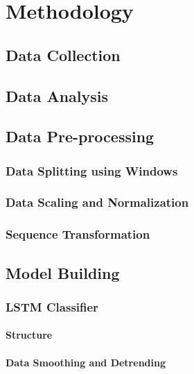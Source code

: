 \chapter{Methodology}

\section{Data Collection}

\section{Data Analysis}

\section{Data Pre-processing}
\subsection{Data Splitting using Windows}

\subsection{Data Scaling and Normalization}

\subsection{Sequence Transformation}

\section{Model Building}
\subsection{LSTM Classifier}
\subsubsection{Structure}

\subsubsection{Data Smoothing and Detrending}

